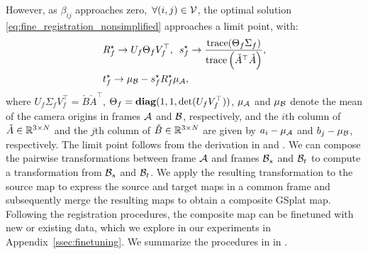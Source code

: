 However, as ${\beta_{ij}}$ approaches zero,~${\forall (i, j) \in \mathcal{V}}$, the optimal solution \eqref{eq:fine_registration_nonsimplified} approaches a limit point, with:
\begin{equation}
    \label{eq:bundle_adjustment_opt}
    \begin{aligned}
        &R_{f}^{\star} \rightarrow U_{f} \Theta_{f} V_{f}^{\top}, 
        \enspace 
        s_{f}^{\star} \rightarrow \frac{\mathrm{trace}(\Theta_{f} \Sigma_{f})}{\mathrm{trace}\left(\check{A}^{\top}\check{A}\right)},
        \\
        &t_{f}^{\star} \rightarrow  \mu_{\mathcal{B}} - s_{f}^{\star} R_{f}^{\star} \mu_{\mathcal{A}},
    \end{aligned}
\end{equation}
where ${U_{f} \Sigma_{f} V_{f}^{\top} = \check{B}\check{A}^{\top}}$, ${\Theta_{f} = \mathrm{\mathbf{diag}}(1, 1, \det(U_{f}V_{f}^{\top}))}$, $\mu_{\mathcal{A}}$ and $\mu_{\mathcal{B}}$ denote the mean of the camera origins in frames $\mathcal{A}$ and $\mathcal{B}$, respectively, and the $i$th column of ${\check{A} \in \mathbb{R}^{3 \times N}}$ and the $j$th column of ${\check{B} \in \mathbb{R}^{3 \times N}}$ are given by ${a_{i} - \mu_{\mathcal{A}}}$ and ${b_{j} - \mu_{\mathcal{B}}}$, respectively. The limit point follows from the derivation in  and \cite{umeyama1991least}. We can compose the pairwise transformations between frame $\mathcal{A}$ and frames $\mathcal{B}_{s}$ and $\mathcal{B}_{t}$ to compute a transformation from $\mathcal{B}_{s}$ and $\mathcal{B}_{t}$. We apply the resulting transformation to the source map to express the source and target maps in a common frame and subsequently merge the resulting maps to obtain a composite GSplat map. Following the registration procedures, the composite map can be finetuned with new or existing data, which we explore in our experiments in Appendix~\ref{ssec:finetuning}.
We summarize the procedures in \algname in .

